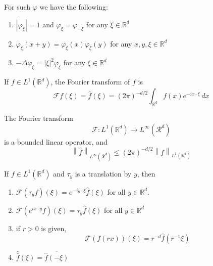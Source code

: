 \documentclass{article}
\newcommand{\norm}[1]{\left\lVert#1\right\rVert}
\begin{document}
\begin{proposition}
  For such $\varphi$ we have the following:
\begin{enumerate}
  \item $|\varphi_\xi| = 1$ and $\bar{\varphi_\xi} = \varphi_{-\xi}$ for any $\xi \in \mathbb{R}^d$ 
  \item $\varphi_\xi(x + y) = \varphi_\xi(x)\varphi_\xi(y)$ for any $x,y,\xi \in \mathbb{R}^d$ 
  \item $-\Delta \varphi_\xi = |\xi|^2 \varphi_\xi$ for any $\xi \in \mathbb{R}^d$
\end{enumerate}
\end{proposition}
\begin{principle}
  If $f \in L^1(\mathbb{R}^d)$, the Fourier transform of $f$ is 
  \begin{equation*}
    \mathcal{F}f(\xi) = \hat{f}(\xi) = (2\pi)^{-d/2} \int_{\mathbb{R}^d} f(x)e^{-ix \cdot \xi} \, dx
  \end{equation*}
\end{principle}

\begin{proposition}
  The Fourier transform
  \begin{equation*}
    \mathcal{F}: L^1(\mathbb{R}^d) \to L^\infty (\mathcal{R}^d)
  \end{equation*}
  is a bounded linear operator, and 
  \begin{equation*}
    \norm{\hat{f}}_{L^\infty (\mathcal{R}^d)} \leq (2\pi)^{-d/2} \norm{f}_{L^1(\mathbb{R}^d)}
  \end{equation*}
\end{proposition}

\begin{proposition}
  If $f \in L^1(\mathbb{R}^d)$ and $\tau_y$ is a translation by $y$, then
  \begin{enumerate}
  \item $\mathcal{F}(\tau_yf)(\xi) = e^{-iy \cdot \xi}\hat{f}(\xi)$ for all $y \in \mathbb{R}^d$. 
\item $\mathcal{F}(e^{ix \cdot y}f)(\xi) = \tau_y \hat{f}(\xi)$ for all $y \in \mathbb{R}^d$ 
    \item if $r > 0$ is given,
      \begin{equation*}
        \mathcal{F}(f(rx))(\xi) = r^{-d}\hat{f}(r^{-1}\xi)
      \end{equation*}
  
    \item $\hat{\bar{f}}(\xi) = \overline{\hat{f}(-\xi)}$
  \end{enumerate}
\end{proposition}
\end{document}
